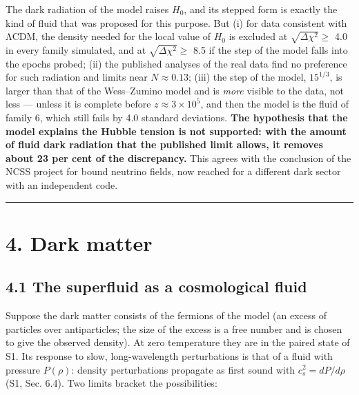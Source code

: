 \documentclass[
  10pt,
]{article}
\begin{document}
The dark radiation of the model raises \(H_0\), and its stepped form is
exactly the kind of fluid that was proposed for this purpose. But (i)
for data consistent with ΛCDM, the density needed for the local value of
\(H_0\) is excluded at \(\sqrt{\Delta\chi^2}\ge\) 4.0 in every family
simulated, and at \(\sqrt{\Delta\chi^2}\ge\) 8.5 if the step of the
model falls into the epochs probed; (ii) the published analyses of the
real data find no preference for such radiation and limits near
\(N\approx0.13\); (iii) the step of the model, \(15^{1/3}\), is larger
than that of the Wess--Zumino model and is \emph{more} visible to the
data, not less --- unless it is complete before \(z\approx3\times10^5\),
and then the model is the fluid of family 6, which still fails by 4.0
standard deviations. \textbf{The hypothesis that the model explains the
Hubble tension is not supported: with the amount of fluid dark radiation
that the published limit allows, it removes about 23 per cent of the
discrepancy.} This agrees with the conclusion of the NCSS project for
bound neutrino fields, now reached for a different dark sector with an
independent code.

\begin{center}\rule{0.5\linewidth}{0.5pt}\end{center}

\hypertarget{dark-matter}{%
\section{4. Dark matter}\label{dark-matter}}

\hypertarget{the-superfluid-as-a-cosmological-fluid}{%
\subsection{4.1 The superfluid as a cosmological
fluid}\label{the-superfluid-as-a-cosmological-fluid}}

Suppose the dark matter consists of the fermions of the model (an excess
of particles over antiparticles; the size of the excess is a free number
and is chosen to give the observed density). At zero temperature they
are in the paired state of S1. Its response to slow, long-wavelength
perturbations is that of a fluid with pressure \(P(\rho)\): density
perturbations propagate as first sound with \(c_s^2=dP/d\rho\) (S1, Sec.
6.4). Two limits bracket the possibilities:
\end{document}
